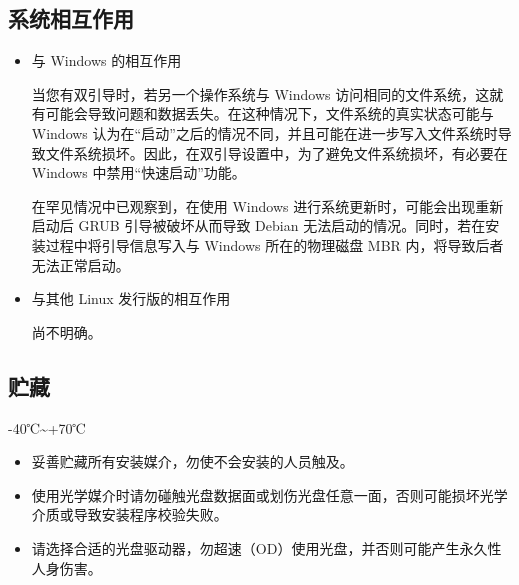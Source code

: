 \documentclass{article}
\begin{document}
\begin{multicols*}{3}





	\begin{tcolorbox}
	\section*{系统相互作用}
	\end{tcolorbox}
	\begin{itemize}[leftmargin=*]
		\setlength{\parindent}{0pt}

		\item 与 Windows 的相互作用

		当您有双引导时，若另一个操作系统与 Windows 访问相同的文件系统，这就有可能会导致问题和数据丢失。在这种情况下，文件系统的真实状态可能与 Windows 认为在“启动”之后的情况不同，并且可能在进一步写入文件系统时导致文件系统损坏。因此，在双引导设置中，为了避免文件系统损坏，有必要在 Windows 中禁用“快速启动”功能。

		在罕见情况中已观察到，在使用 Windows 进行系统更新时，可能会出现重新启动后 GRUB 引导被破坏从而导致 Debian 无法启动的情况。同时，若在安装过程中将引导信息写入与 Windows 所在的物理磁盘 MBR 内，将导致后者无法正常启动。

		\item 与其他 Linux 发行版的相互作用

		尚不明确。

	\end{itemize}


	\begin{tcolorbox}
	\section*{贮藏}
	\end{tcolorbox}

	-40℃\textasciitilde +70℃

	\begin{itemize}[leftmargin=*]
		\setlength{\itemsep}{0pt}
		\setlength{\parskip}{0pt}
		\setlength{\parsep}{0pt}
		\item 妥善贮藏所有安装媒介，勿使不会安装的人员触及。
		\item 使用光学媒介时请勿碰触光盘数据面或划伤光盘任意一面，否则可能损坏光学介质或导致安装程序校验失败。
		\item 请选择合适的光盘驱动器，勿超速（OD）使用光盘，并否则可能产生永久性人身伤害。
		\end{itemize}
	\medskip



\end{multicols*}
\end{document}
